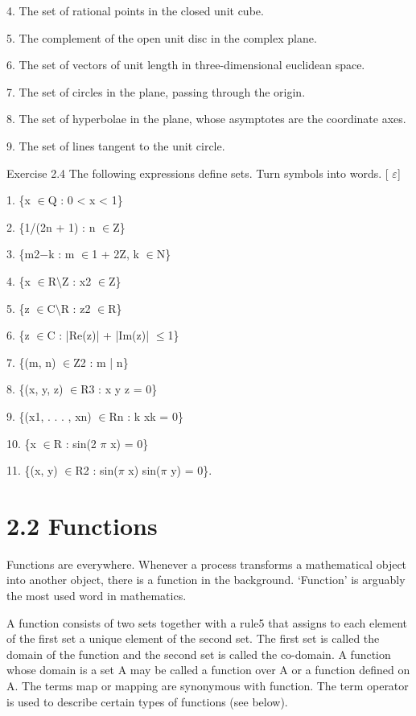 \documentclass[11pt]{article}
\theoremstyle{plain}
\theoremstyle{definition}
\begin{document}
4. The set of rational points in the closed unit cube.

5. The complement of the open unit disc in the complex plane.

6. The set of vectors of unit length in three-dimensional euclidean space.

7. The set of circles in the plane, passing through the origin.

8. The set of hyperbolae in the plane, whose asymptotes are the coordinate axes.

9. The set of lines tangent to the unit circle.

Exercise 2.4 The following expressions define sets. Turn symbols into words. [ $\varepsilon$]

1. \{x $\in$Q : 0 < x < 1\}

2. \{1/(2n + 1) : n $\in$Z\}

3. \{m2$-$k : m $\in$1 + 2Z, k $\in$N\}

4. \{x $\in$R$\setminus$Z : x2 $\in$Z\}

5. \{z $\in$C$\setminus$R : z2 $\in$R\}

6. \{z $\in$C : |Re(z)| + |Im(z)| $\leq$1\}

7. \{(m, n) $\in$Z2 : m | n\}

8. \{(x, y, z) $\in$R3 : x y z = 0\}

9. \{(x1, . . . , xn) $\in$Rn : k xk = 0\}

10. \{x $\in$R : sin(2 $\pi$ x) = 0\}

11. \{(x, y) $\in$R2 : sin($\pi$ x) sin($\pi$ y) = 0\}.

\section{2.2 Functions}

Functions are everywhere. Whenever a process transforms a mathematical object into another object, there is a function in the background. `Function' is arguably the most used word in mathematics.

A function consists of two sets together with a rule5 that assigns to each element of the first set a unique element of the second set. The first set is called the domain of the function and the second set is called the co-domain. A function whose domain is a set A may be called a function over A or a function defined on A. The terms map or mapping are synonymous with function. The term operator is used to describe certain types of functions (see below).
\end{document}
